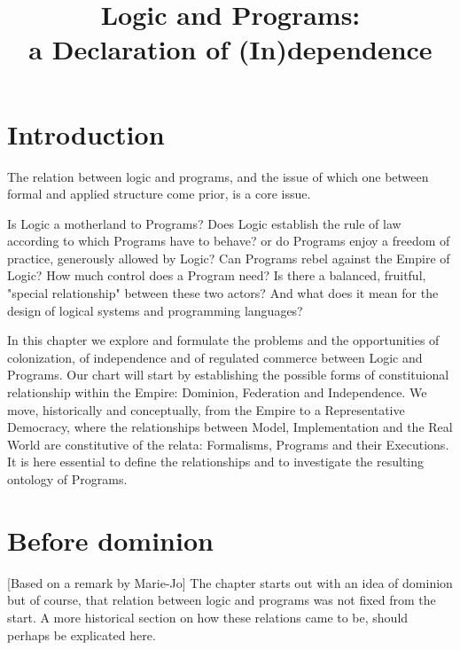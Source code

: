 \documentclass[]{article}
\title{Logic and Programs:\\
	 a Declaration of (In)dependence}
\author{}
\date{}
\begin{document}
\tableofcontents
\maketitle


%



\section{Introduction}

The relation between logic and programs, and the issue of which one between formal and applied structure come prior, is a core issue.


Is Logic a motherland to Programs? Does Logic establish the rule of law according to which Programs have to behave? or do Programs enjoy a freedom of practice, generously allowed by Logic? Can Programs rebel against the Empire of Logic? How much control does a Program need? Is there a balanced, fruitful, "special relationship" between these two actors? And what does it mean for the design of logical systems and programming languages?

In this chapter we explore and formulate the problems and the opportunities of colonization, of independence and of regulated commerce between Logic and Programs. Our chart will start by establishing the possible forms of constituional relationship within the Empire: Dominion, Federation and Independence. We move, historically and conceptually, from the Empire to a Representative Democracy, where the relationships between Model, Implementation and the Real World are constitutive of the relata: Formalisms, Programs and their Executions. It is here essential to define the relationships and to investigate the resulting ontology of Programs.


\section{Before dominion}



[Based on a remark by Marie-Jo] The chapter starts out with an idea of dominion but of course, that relation between logic and programs was not fixed from the start. A more historical section on how these relations came to be, should perhaps be explicated here.
\end{document}
